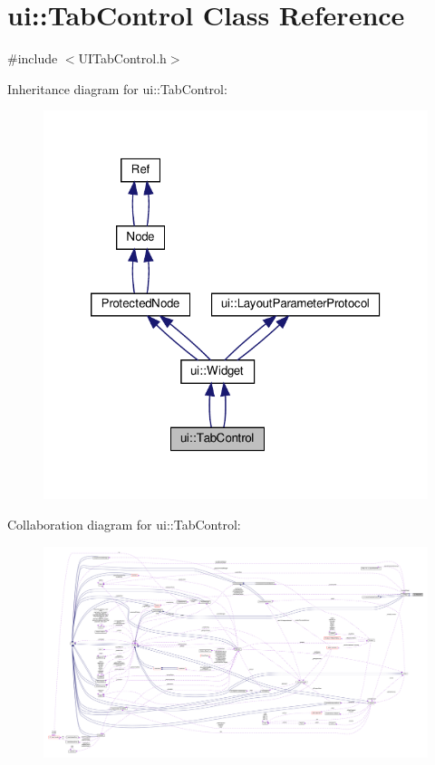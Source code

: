 \hypertarget{classui_1_1TabControl}{}\section{ui\+:\+:Tab\+Control Class Reference}
\label{classui_1_1TabControl}


{\ttfamily \#include $<$U\+I\+Tab\+Control.\+h$>$}



Inheritance diagram for ui\+:\+:Tab\+Control\+:
\nopagebreak
\begin{figure}[H]
\begin{center}
\leavevmode
\includegraphics[width=320pt]{classui_1_1TabControl__inherit__graph}
\end{center}
\end{figure}


Collaboration diagram for ui\+:\+:Tab\+Control\+:
\nopagebreak
\begin{figure}[H]
\begin{center}
\leavevmode
\includegraphics[width=350pt]{classui_1_1TabControl__coll__graph}
\end{center}
\end{figure}
